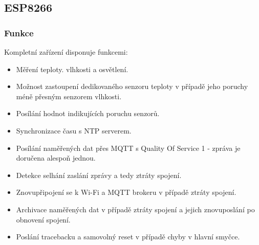 \subsection{ESP8266}
\subsubsection{Funkce}
Kompletní zařízení disponuje funkcemi:
\begin{itemize}
    \item Měření teploty. vlhkosti a osvětlení.
    \item Možnost zastoupení dedikovaného senzoru teploty v případě jeho poruchy méně přesným senzorem vlhkosti.
    \item Posílání hodnot indikujících poruchu senzorů.
    \item Synchronizace času s NTP serverem.
    \item Posílání naměřených dat přes MQTT s Quality Of Service 1 - zpráva je doručena alespoň jednou.
    \item Detekce selhání zaslání zprávy a tedy ztráty spojení.
    \item Znovupřipojení se k Wi-Fi a MQTT brokeru v případě ztráty spojení.
    \item Archivace naměřených dat v případě ztráty spojení a jejich znovuposlání po obnovení spojení.
    \item Poslání tracebacku a samovolný reset v případě chyby v hlavní smyčce.
\end{itemize}
